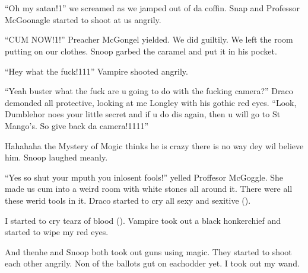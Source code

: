 \section[]{\protect{}}



\enquote{Oh my satan!1} we screamed as we jamped out of da coffin. Snap and Professor McGoonagle started to shoot at us angrily.

\enquote{CUM NOW!1!} Preacher McGongel yielded. We did guiltily. We left the room putting on our clothes. Snoop garbed the caramel and put it in his pocket.

\enquote{Hey what the fuck!111} Vampire shooted angrily.

\enquote{Yeah buster what the fuck are u going to do with the fucking camera?} Draco demonded all protective, looking at me Longley with his gothic red eyes. \enquote{Look, Dumblehor noes your little secret and if u do dis again, then u will go to St Mango's. So give back da camera!1111}

Hahahaha the Mystery of Mogic thinks he is crazy there is no way dey wil believe him. Snoop laughed meanly.

\enquote{Yes so shut your mputh you inlosent fools!} yelled Proffesor McGoggle. She made us cum into a weird room with white stones all around it. There were all these werid tools in it. Draco started to cry all sexy and sexitive ().

I started to cry tearz of blood (). Vampire took out a black honkerchief and started to wipe my red eyes.

And then\dotfill\newline he and Snoop both took out guns using magic. They started to shoot each other angrily. Non of the ballots gut on eachodder yet. I took out my wand.

